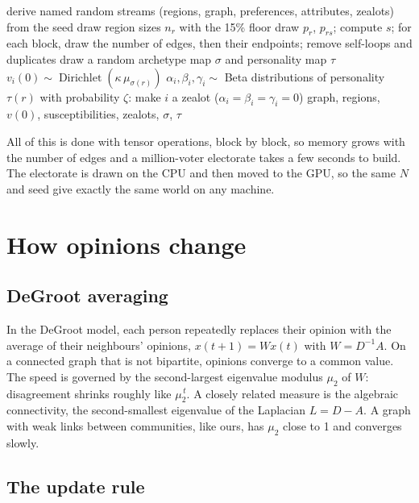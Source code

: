 \documentclass[11pt,a4paper,oneside]{report}
\begin{document}
\begin{algorithm}[t]
\caption{Generate an electorate from $(N, \text{seed})$}\label{alg:electorate}
\begin{algorithmic}[1]
\State derive named random streams (regions, graph, preferences, attributes, zealots) from the seed
\State draw region sizes $n_r$ with the 15\% floor
\State draw $p_r$, $p_{rs}$; compute $s$; for each block, draw the number of edges, then their endpoints;
       remove self-loops and duplicates
\State draw a random archetype map $\sigma$ and personality map $\tau$
  \State $v_i(0) \sim \operatorname{Dirichlet}(\kappa\,\mu_{\sigma(r)})$
  \State $\alpha_i,\beta_i,\gamma_i \sim$ Beta distributions of personality $\tau(r)$
  \State with probability $\zeta$: make $i$ a zealot ($\alpha_i=\beta_i=\gamma_i=0$)
\EndFor
\State \Return graph, regions, $v(0)$, susceptibilities, zealots, $\sigma$, $\tau$
\end{algorithmic}
\end{algorithm}

All of this is done with tensor operations, block by block, so memory grows with the number of edges and
a million-voter electorate takes a few seconds to build. The electorate is drawn on the CPU and then moved
to the GPU, so the same $N$ and seed give exactly the same world on any machine.

\section{How opinions change}

\subsection{DeGroot averaging}

In the DeGroot model, each person repeatedly replaces their opinion with the average of
their neighbours' opinions, $x(t+1) = W x(t)$ with $W = D^{-1}A$. On a connected graph that is not
bipartite, opinions converge to a common value. The speed is governed by the second-largest eigenvalue
modulus $\mu_2$ of $W$: disagreement shrinks roughly like $\mu_2^{\,t}$. A
closely related measure is the algebraic connectivity, the second-smallest eigenvalue of the Laplacian
$L = D - A$. A graph with weak links between communities, like ours, has $\mu_2$ close
to 1 and converges slowly.

\subsection{The update rule}
\end{document}
